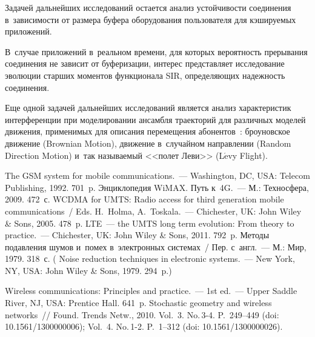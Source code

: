 \begin{multicols}{2}
Задачей дальнейших 
исследований остается анализ устойчивости соединения в~зависимости от 
размера буфера оборудования пользователя для кэшируемых приложений. 

В~случае приложений в~реальном времени, для которых вероятность 
прерывания соединения не зависит от буферизации, интерес представляет 
исследование эволюции старших моментов функционала SIR, определяющих 
надежность соединения. 

Еще одной задачей дальнейших исследований является 
анализ характеристик интерференции при моделировании ансамбля траекторий 
для различных моделей движения, применимых для описания перемещения 
абонентов~\cite{18-g1}: броуновское движение (Brownian Motion), движение 
в~случайном на\-прав\-ле\-нии (Random Direction Motion) и~так на\-зы\-ва\-емый 
<<полет Леви>> (L$\acute{\mbox{e}}$vy Flight).

{\small\frenchspacing
 {%
 \begin{thebibliography}{99}
 The GSM system for mobile communications.~--- Washington, DC, 
USA: Telecom Publishing, 1992. 701~p.
 Энциклопедия WiMAX. Путь 
к~4G.~--- М.: Техносфера, 2009. 472~с.
 WCDMA for UMTS: Radio access for third generation mobile communications~/
Eds. H.~Holma, A.~Toskala.~--- Chichester, UK: John Wiley \& Sons, 2005. 478~p.
 LTE~--- the UMTS long term evolution: From theory to  
practice.~--- Chichester, UK: John Wiley \& Sons, 2011. 792~p.
 Методы подавления шумов и~помех в~электронных системах~/
Пер. с~англ.~--- М.: Мир, 1979.  318~с.
( {Noise reduction techniques in electronic systems}.~--- 
New York, NY, USA: John Wiley \& Sons, 1979. 294~p.)

 Wireless communications: Principles and practice.~--- 1st ed.~--- 
Upper Saddle River, NJ, USA: Prentice Hall. 641~p.
 Stochastic geometry and wireless networks~// Found. 
Trends Netw., 2010. Vol.~3. No.\,3-4. P.~249--449
(doi: 10.1561/1300000006); Vol.~4. No.\,1-2. P.~1--312 (doi: 10.1561/1300000026).


\end{thebibliography}}}
\end{multicols}
